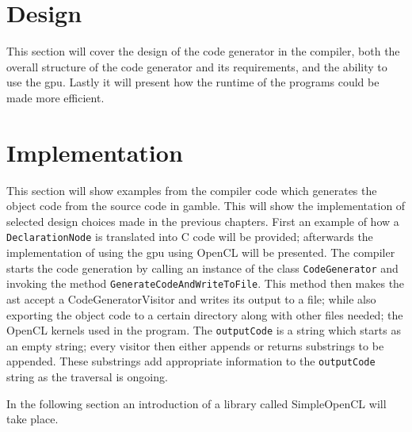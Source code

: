 
\section{Design}
This section will cover the design of the code generator in the compiler, both the overall structure of the code generator and its requirements, and the ability to use the \acrshort{gpu}.
Lastly it will present how the runtime of the programs could be made more efficient.



\section{Implementation}
This section will show examples from the compiler code which generates the object code from the source code in \gls{gamble}.
This will show the implementation of selected design choices made in the previous chapters.
First an example of how a \texttt{DeclarationNode} is translated into C code will be provided; afterwards the implementation of using the \acrshort{gpu} using OpenCL will be presented.
The compiler starts the code generation by calling an instance of the class \texttt{CodeGenerator} and invoking the method \texttt{GenerateCodeAndWriteToFile}.
This method then makes the \acrshort{ast} accept a CodeGeneratorVisitor and writes its output to a file; while also exporting the object code to a certain directory along with other files needed; the OpenCL kernels used in the program.
The \texttt{outputCode} is a string which starts as an empty string; every visitor then either appends or returns substrings to be appended.
These substrings add appropriate information to the \texttt{outputCode} string as the traversal is ongoing.



In the following section an introduction of a library called SimpleOpenCL will take place.

